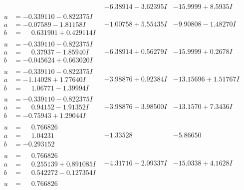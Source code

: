 \documentclass[1p]{elsarticle_modified}
\theoremstyle{definition}
\begin{document}
$$\begin{array}{c|c|c}
 & -6.38914 - 3.62395 I & -15.9999 + 8.5935 I \\ \hline\begin{aligned}
u &= -0.339110 - 0.822375 I \\
a &= -0.07589 - 1.81158 I \\
b &= \phantom{-}0.631901 + 0.429114 I\end{aligned}
 & -1.00758 + 5.55435 I & -9.90808 - 1.48270 I \\ \hline\begin{aligned}
u &= -0.339110 - 0.822375 I \\
a &= \phantom{-}0.37937 - 1.85940 I \\
b &= -0.045624 + 0.663020 I\end{aligned}
 & -6.38914 + 0.56279 I & -15.9999 + 0.2678 I \\ \hline\begin{aligned}
u &= -0.339110 - 0.822375 I \\
a &= -1.14028 + 1.77640 I \\
b &= \phantom{-}1.06771 - 1.39994 I\end{aligned}
 & -3.98876 + 0.92384 I & -13.15696 + 1.51767 I \\ \hline\begin{aligned}
u &= -0.339110 - 0.822375 I \\
a &= \phantom{-}0.94152 - 1.91352 I \\
b &= -0.75943 + 1.29044 I\end{aligned}
 & -3.98876 - 3.98500 I & -13.1570 + 7.3436 I \\ \hline\begin{aligned}
u &= \phantom{-}0.766826\phantom{ +0.000000I} \\
a &= \phantom{-}1.04231\phantom{ +0.000000I} \\
b &= -0.293152\phantom{ +0.000000I}\end{aligned}
 & -1.33528\phantom{ +0.000000I} & -5.86650\phantom{ +0.000000I} \\ \hline\begin{aligned}
u &= \phantom{-}0.766826\phantom{ +0.000000I} \\
a &= \phantom{-}0.255139 + 0.891085 I \\
b &= \phantom{-}0.542272 - 0.127354 I\end{aligned}
 & -4.31716 - 2.09337 I & -15.0338 + 4.1628 I \\ \hline\begin{aligned}
u &= \phantom{-}0.766826\phantom{ +0.000000I} \\

\end{aligned}
\end{array}$$
\end{document}
